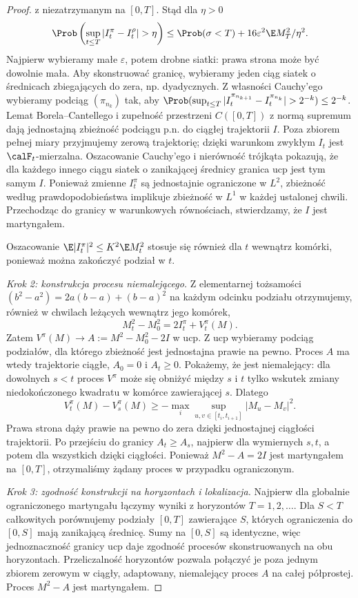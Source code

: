 \begin{proof}
z niezatrzymanym na $[0,T]$. Stąd dla $\eta>0$
\[
\Prob\left(\sup_{t\le T}|I_t^\pi-I_t^\rho|>\eta\right)
\le\Prob(\sigma<T)+16\varepsilon^2\E M_T^2/\eta^2.
\]
Najpierw wybieramy małe $\varepsilon$, potem drobne
siatki: prawa strona może być dowolnie mała.
Aby skonstruować granicę, wybieramy jeden ciąg siatek
o średnicach zbiegających do zera, np. dyadycznych.
Z własności Cauchy'ego wybieramy podciąg $(\pi_{n_k})$
tak, aby
$\Prob(\sup_{t\le T}|I^{\pi_{n_{k+1}}}_t-I^{\pi_{n_k}}_t|>2^{-k})
\le2^{-k}$.
Lemat Borela--Cantellego i zupełność przestrzeni
$C([0,T])$ z normą supremum dają jednostajną
zbieżność podciągu p.n. do ciągłej trajektorii $I$.
Poza zbiorem pełnej miary przyjmujemy zerową
trajektorię; dzięki warunkom zwykłym $I_t$ jest
$\calF_t$-mierzalna. Oszacowanie Cauchy'ego i
nierówność trójkąta pokazują, że dla każdego
innego ciągu siatek o zanikającej średnicy
granica ucp jest tym samym $I$.
Ponieważ zmienne $I_t^\pi$ są jednostajnie ograniczone
w $L^2$, zbieżność według prawdopodobieństwa implikuje
zbieżność w $L^1$ w każdej ustalonej chwili.
Przechodząc do granicy w warunkowych równościach,
stwierdzamy, że $I$ jest martyngałem.


Oszacowanie $\E|I_t^\pi|^2\le K^2\E M_t^2$
stosuje się również dla $t$ wewnątrz komórki,
ponieważ można zakończyć podział w $t$.


\emph{Krok 2: konstrukcja procesu niemalejącego.}
Z elementarnej tożsamości
$(b^2-a^2)=2a(b-a)+(b-a)^2$
na każdym odcinku podziału otrzymujemy, również
w chwilach leżących wewnątrz jego komórek,
\[
M_t^2-M_0^2=2I_t^\pi+V_t^\pi(M).
\]
Zatem $V^\pi(M)\to A:=M^2-M_0^2-2I$ w ucp.
Z ucp wybieramy podciąg podziałów, dla którego
zbieżność jest jednostajna prawie na pewno.
Proces $A$ ma wtedy trajektorie ciągłe, $A_0=0$
i $A_t\ge0$. Pokażemy, że jest niemalejący:
dla dowolnych $s<t$ proces $V^\pi$ może się obniżyć
między $s$ i $t$ tylko wskutek zmiany niedokończonego
kwadratu w komórce zawierającej $s$. Dlatego
\[
V_t^\pi(M)-V_s^\pi(M)
\ge-\max_i\sup_{u,v\in[t_i,t_{i+1}]}
|M_u-M_v|^2.
\]
Prawa strona dąży prawie na pewno do zera dzięki
jednostajnej ciągłości trajektorii. Po przejściu
do granicy $A_t\ge A_s$, najpierw dla wymiernych
$s,t$, a potem dla wszystkich dzięki ciągłości.
Ponieważ $M^2-A=2I$ jest martyngałem na $[0,T]$,
otrzymaliśmy żądany proces w przypadku ograniczonym.

\emph{Krok 3: zgodność konstrukcji na horyzontach i lokalizacja.}
Najpierw dla globalnie ograniczonego martyngału
łączymy wyniki z horyzontów $T=1,2,\ldots$.
Dla $S<T$ całkowitych porównujemy podziały $[0,T]$
zawierające $S$, których ograniczenia do $[0,S]$
mają zanikającą średnicę. Sumy na $[0,S]$ są
identyczne, więc jednoznaczność granicy ucp daje
zgodność procesów skonstruowanych na obu horyzontach.
Przeliczalność horyzontów pozwala połączyć je poza
jednym zbiorem zerowym w ciągły, adaptowany,
niemalejący proces $A$ na całej półprostej.
Proces $M^2-A$ jest martyngałem.


\end{proof}

